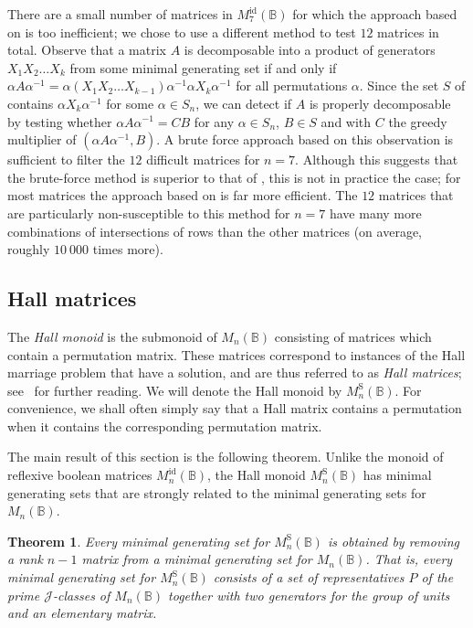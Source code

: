 \documentclass[11pt]{article}
\newtheorem{thm}{Theorem}[subsection]
\numberwithin{equation}{section}
\newcommand{\B}{\mathbb{B}}
\newcommand{\Bn}{M_n(\B)}
\newcommand{\Refln}{M_n^{\text{id}}(\B)}
\newcommand{\Refl}[1]{M_{#1}^{\text{id}}(\B)}
\newcommand{\Halln}{M_n^{\text{S}}(\B)}
\newcommand{\J}{\mathscr{J}}
\begin{document}
There are a small number of matrices in $\Refl{7}$ for which the approach based on
 is too inefficient; we chose to use a
different method to test $12$ matrices in total. Observe that a matrix $A$ is
decomposable into a product of generators $X_1 X_2 \ldots X_k$ from some minimal
generating set if and only if $\alpha A \alpha^{-1} = \alpha (X_1 X_2 \ldots
X_{k-1})\alpha^{-1}\alpha X_k \alpha^{-1}$ for all permutations $\alpha$. Since
the set $S$ of  contains $\alpha X_k
\alpha^{-1}$ for some $\alpha \in S_n$, we can detect if $A$ is properly
decomposable by testing whether $\alpha A \alpha^{-1} = CB$ for any $\alpha \in
S_n$, $B \in S$ and with $C$ the greedy multiplier of $(\alpha A \alpha^{-1},
B)$. A brute force approach based on this observation is sufficient to filter
the $12$ difficult matrices for $n = 7$. Although this suggests that the
brute-force method is superior to that of ,
this is not in practice the case; for most matrices the approach based on
 is far more efficient. The $12$ matrices that
are particularly non-susceptible to this method for $n = 7$ have many more
combinations of intersections of rows than the other matrices (on average,
roughly $10\ 000$ times more).


\subsection{Hall matrices}
\label{sec:HallBoolMat}

The \emph{Hall monoid} is the submonoid of $\Bn$ consisting of matrices which
contain a permutation matrix. These matrices correspond to instances of the Hall
marriage problem that have a solution, and are thus referred to as \emph{Hall
  matrices}; see~\cite{Schwarz1973aa, Butler1974aa, Tan2000aa, Cho1993ab} for
further reading.
We will denote the Hall monoid by $\Halln$. For convenience, we shall often
simply say that a Hall matrix contains a permutation when it contains the
corresponding permutation matrix.

The main result of this section is the following theorem. Unlike the monoid of
reflexive boolean matrices $\Refln$, the Hall monoid $\Halln$ has minimal
generating sets that are strongly related to the minimal generating sets for
$\Bn$.
\begin{thm}
  Every minimal generating set for $\Halln$ is obtained by removing a rank $n-1$
  matrix from a minimal generating set for $\Bn$. That is, every minimal
  generating set for $\Halln$ consists of a set of representatives $P$ of the
  prime $\J$-classes of $\Bn$ together with two generators for the group of units
  and an elementary matrix.
\end{thm}
\end{document}
